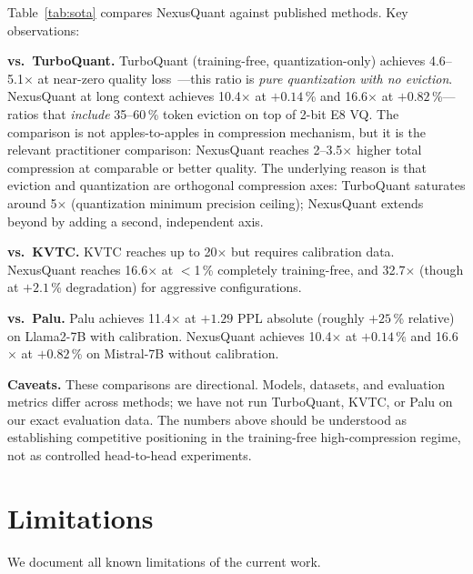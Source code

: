\documentclass{article}
\begin{document}
Table~\ref{tab:sota} compares NexusQuant against published methods. Key
observations:

\textbf{vs.\ TurboQuant.} TurboQuant (training-free, quantization-only) achieves
4.6--5.1$\times$ at near-zero quality loss~\cite{turboquant_plus2026}---this ratio
is \emph{pure quantization with no eviction}.  NexusQuant at long context achieves
10.4$\times$ at $+0.14$\,\% and 16.6$\times$ at $+0.82$\,\%---ratios that
\emph{include} 35--60\,\% token eviction on top of 2-bit E8 VQ.
The comparison is not apples-to-apples in compression mechanism, but it is the
relevant practitioner comparison: NexusQuant reaches 2--3.5$\times$ higher total
compression at comparable or better quality.  The underlying reason is that eviction
and quantization are orthogonal compression axes: TurboQuant saturates around
5$\times$ (quantization minimum precision ceiling); NexusQuant extends beyond by
adding a second, independent axis.

\textbf{vs.\ KVTC.} KVTC reaches up to 20$\times$ but requires calibration data.
NexusQuant reaches 16.6$\times$ at $<$1\,\% completely training-free, and
32.7$\times$ (though at $+2.1$\,\% degradation) for aggressive configurations.

\textbf{vs.\ Palu.} Palu achieves 11.4$\times$ at $+1.29$ PPL absolute (roughly
$+25$\,\% relative) on Llama2-7B with calibration. NexusQuant achieves 10.4$\times$
at $+0.14$\,\% and 16.6$\times$ at $+0.82$\,\% on Mistral-7B without calibration.

\textbf{Caveats.} These comparisons are directional. Models, datasets, and
evaluation metrics differ across methods; we have not run TurboQuant, KVTC,
or Palu on our exact evaluation data. The numbers above should be understood
as establishing competitive positioning in the training-free high-compression
regime, not as controlled head-to-head experiments.

\section{Limitations}
\label{sec:limitations}

We document all known limitations of the current work.
\end{document}
